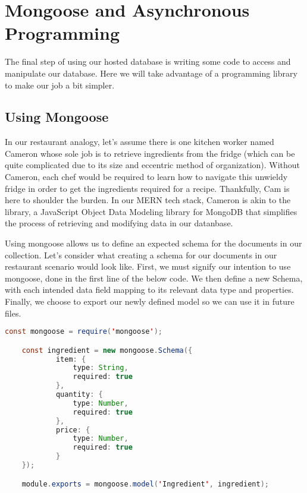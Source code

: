 \section{Mongoose and Asynchronous Programming}

The final step of using our hosted database is writing some code to access and manipulate our database. Here we will take advantage of a programming library to make our job a bit simpler. 

\subsection*{Using Mongoose}

In our restaurant analogy, let's assume there is one kitchen worker named Cameron whose sole job is to retrieve ingredients from the fridge (which can be quite complicated due to its size and eccentric method of organization). Without Cameron, each chef would be required to learn how to navigate this unwieldy fridge in order to get the ingredients required for a recipe. Thankfully, Cam is here to shoulder the burden. In our MERN tech stack, Cameron is akin to the  library, a JavaScript Object Data Modeling library for MongoDB that simplifies the process of retrieving and modifying data in our datanbase. 

Using mongoose allows us to define an expected schema for the documents in our collection. Let's consider what creating a schema for our documents in our restaurant scenario would look like. First, we must signify our intention to use mongoose, done in the first line of the below code. We then define a new Schema, with each intended data field mapping to its relevant data type and properties. Finally, we choose to export our newly defined model so we can use it in future files.

\vspace{.5cm}

\begin{lstlisting}[language=Java]
    const mongoose = require('mongoose');

    const ingredient = new mongoose.Schema({
            item: {
                type: String,
                required: true
            },
            quantity: {
                type: Number,
                required: true
            },
            price: {
                type: Number,
                required: true
            }
    });

    module.exports = mongoose.model('Ingredient', ingredient);
\end{lstlisting}

